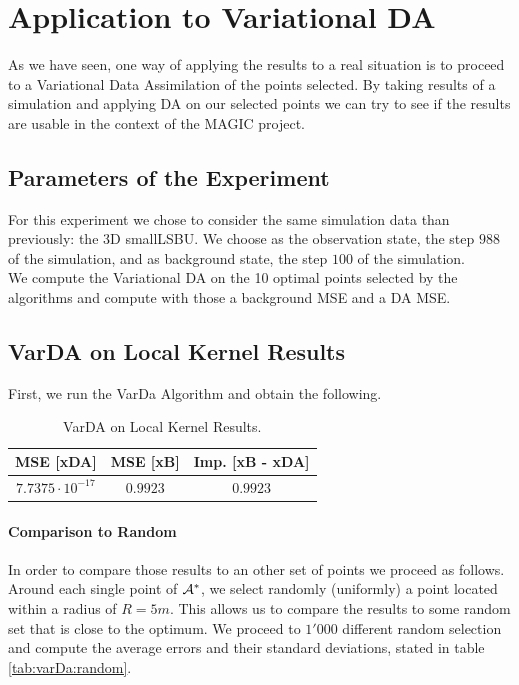 
\section{Application to Variational DA}


As we have seen, one way of applying the results to a real situation is to proceed to a Variational Data Assimilation of the points selected. By taking results of a simulation and applying DA on our selected points we can try to see if the results are usable in the context of the MAGIC project. 

\subsection{Parameters of the Experiment} 

For this experiment we chose to consider the same simulation data than previously: the 3D smallLSBU.  We choose as the observation state, the step $988$ of the simulation, and as background state, the step $100$ of the simulation. \\

We compute the Variational DA on the 10 optimal points selected by the algorithms and compute with those a background MSE and a DA MSE. 

\subsection{VarDA on Local Kernel Results}

First, we run the VarDa Algorithm and obtain the following. 
\begin{table}[h]
\centering
	\begin{tabular}{c|c|c}
	\toprule
		  MSE [xDA] & MSE [xB] &  Imp. [xB - xDA] \\ \midrule
		 $7.7375 \cdot 10^{-17}$ &  $0.9923$ & $0.9923$ \\ \bottomrule
	\end{tabular}
	\caption{VarDA on Local Kernel Results. }
\end{table}

\paragraph{Comparison to Random}

In order to compare those results to an other set of points we proceed as follows. Around each single point of $\mathcal{A}^*$, we select randomly (uniformly) a point located within a radius of $R=5m$. This allows us to compare the results to some random set that is close to the optimum. We proceed to $1'000$ different random selection and compute the average errors and their standard deviations, stated in table \ref{tab:varDa:random}. \\


